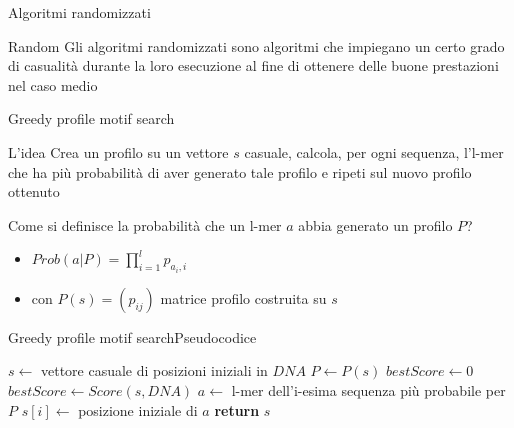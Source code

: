 	\begin{frame}{Algoritmi randomizzati}
		\begin{block}{Random}
			Gli algoritmi randomizzati sono algoritmi che impiegano un certo grado di casualità durante la loro esecuzione al fine di ottenere delle buone prestazioni nel caso medio
		\end{block}
	\end{frame}
	
	\begin{frame}{Greedy profile motif search}
		\begin{block}{L'idea}
			Crea un profilo su un vettore $s$ casuale, calcola, per ogni sequenza, l'l-mer che ha più probabilità di aver generato tale profilo e ripeti sul nuovo profilo ottenuto
		\end{block}
		Come si definisce la  probabilità che un l-mer $a$ abbia generato un profilo $P$?
		\begin{itemize}
			\item $Prob(a|P)=\prod_{i=1}^{l}p_{a_i,i}$
			\item con $P(s)=(p_{ij})$ matrice profilo costruita su $s$ 
		\end{itemize}
	\end{frame}
	
	\begin{frame}{Greedy profile motif search}{Pseudocodice}
		\begin{center}
			\begin{minipage}{10.5cm}
			    \begin{algorithmic}[1]
				    	\State $s\gets$  vettore casuale di posizioni iniziali in $DNA$
				    	\State $P\gets P(s)$
				    	\State $bestScore\gets 0$
				    		\State $bestScore\gets Score(s,DNA)$
				    			\State $a\gets $ l-mer dell'i-esima sequenza più probabile per $P$
				    			\State $s[i]\gets $ posizione iniziale di $a$
				    		\EndFor
				    	\EndWhile
				    	\State \textbf{return} $s$
				    \EndProcedure
			    \end{algorithmic}
			\end{minipage}
	    \end{center}
	\end{frame}
	
